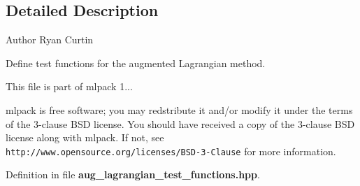 \subsection{Detailed Description}
\begin{DoxyAuthor}{Author}
Ryan Curtin
\end{DoxyAuthor}
Define test functions for the augmented Lagrangian method.

This file is part of mlpack 1...

mlpack is free software; you may redstribute it and/or modify it under the terms of the 3-\/clause B\-S\-D license. You should have received a copy of the 3-\/clause B\-S\-D license along with mlpack. If not, see {\tt http\-://www.\-opensource.\-org/licenses/\-B\-S\-D-\/3-\/\-Clause} for more information. 

Definition in file {\bf aug\-\_\-lagrangian\-\_\-test\-\_\-functions.\-hpp}.

